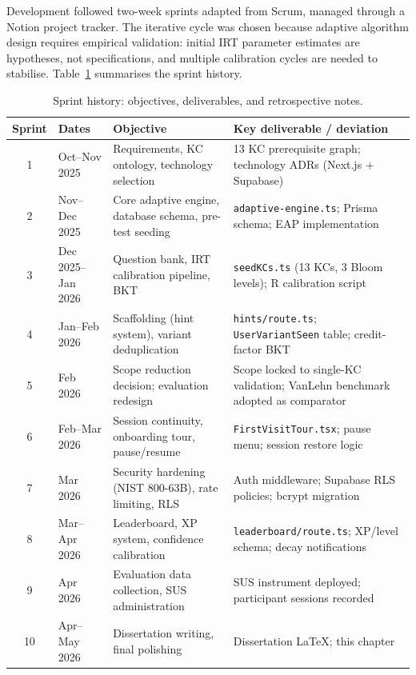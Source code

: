 Development followed two-week sprints adapted from Scrum, managed through a
Notion project tracker. The iterative cycle was chosen because adaptive
algorithm design requires empirical validation: initial IRT parameter estimates
are hypotheses, not specifications, and multiple calibration cycles are needed
to stabilise. Table~\ref{tab:sprints} summarises the sprint history.

\begin{table}[H]
\centering
\caption{Sprint history: objectives, deliverables, and retrospective notes.}
\label{tab:sprints}
\renewcommand{\arraystretch}{1.25}
\begin{tabularx}{\textwidth}{clXX}
\toprule
\textbf{Sprint} & \textbf{Dates} & \textbf{Objective} & \textbf{Key deliverable / deviation} \\
\midrule
1 & Oct--Nov 2025 & Requirements, KC ontology, technology selection &
  13 KC prerequisite graph; technology ADRs (Next.js + Supabase) \\
2 & Nov--Dec 2025 & Core adaptive engine, database schema, pre-test seeding &
  \texttt{adaptive-engine.ts}; Prisma schema; EAP implementation \\
3 & Dec 2025--Jan 2026 & Question bank, IRT calibration pipeline, BKT &
  \texttt{seedKCs.ts} (13 KCs, 3 Bloom levels); R calibration script \\
4 & Jan--Feb 2026 & Scaffolding (hint system), variant deduplication &
  \texttt{hints/route.ts}; \texttt{UserVariantSeen} table; credit-factor BKT \\
5 & Feb 2026 & Scope reduction decision; evaluation redesign &
  Scope locked to single-KC validation; VanLehn benchmark adopted as comparator \\
6 & Feb--Mar 2026 & Session continuity, onboarding tour, pause/resume &
  \texttt{FirstVisitTour.tsx}; pause menu; session restore logic \\
7 & Mar 2026 & Security hardening (NIST 800-63B), rate limiting, RLS &
  Auth middleware; Supabase RLS policies; bcrypt migration \\
8 & Mar--Apr 2026 & Leaderboard, XP system, confidence calibration &
  \texttt{leaderboard/route.ts}; XP/level schema; decay notifications \\
9 & Apr 2026 & Evaluation data collection, SUS administration &
  SUS instrument deployed; participant sessions recorded \\
10 & Apr--May 2026 & Dissertation writing, final polishing &
  Dissertation LaTeX; this chapter \\
\bottomrule
\end{tabularx}
\end{table}

